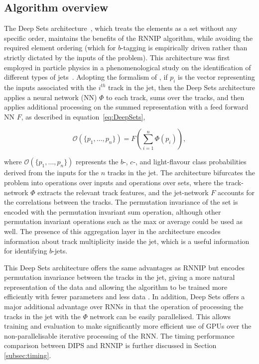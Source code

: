 \def\figpath{figures/ftag/dips-note/}

\subsection{Algorithm overview}

The Deep Sets architecture~\cite{DBLP:journals/corr/ZaheerKRPSS17}, which treats the elements as a set without any specific order, maintains the benefits of the RNNIP algorithm, while avoiding the required element ordering (which for $b$-tagging is empirically driven rather than strictly dictated by the inputs of the problem).
This architecture was first employed in particle physics in a phenomenological study on the identification of different types of jets~\cite{Komiske_2019}.  
Adopting the formalism of \cite{Komiske_2019}, if $p_i$ is the vector representing the inputs associated with the $i^{th}$ track in the jet, then the Deep Sets architecture applies a neural network (NN) $\Phi$ to each track, sums over the tracks, and then applies additional processing on the summed representation with a feed forward NN $F$, as described in equation~\ref{eq:DeepSets},

\begin{equation}
\mathcal{O}\left(  \{ p_1 , \ldots , p_n \}  \right) = F \left( \sum_{i = 1}^n \Phi \left( p_i \right) \right),
\label{eq:DeepSets}
\end{equation}

where $\mathcal{O} \left(  \{ p_1 , \ldots , p_n \}  \right)$ represents the $b$-, $c$-, and light-flavour class probabilities derived from the inputs for the $n$ tracks in the jet. 
The architecture bifurcates the problem into operations over inputs and operations over sets, where the track-network $\Phi$ extracts the relevant track features, and the jet-network $F$ accounts for the correlations between the tracks. 
The permutation invariance of the set is encoded with the permutation invariant sum operation, although other permutation invariant operations such as the max or average could be used as well. 
The presence of this aggregation layer in the architecture encodes information about track multiplicity inside the jet, which is a useful information for identifying $b$-jets.

This Deep Sets architecture offers the same advantages as RNNIP but encodes permutation invariance between the tracks in the jet, giving a more natural representation of the data and allowing the algorithm to be trained more efficiently with fewer parameters and less data \cite{DBLP:journals/corr/abs-1806-01261}.  
In addition, Deep Sets offers a major additional advantage over RNNs in that the operation of processing the tracks in the jet with the $\Phi$ network can be easily parallelised. 
This allows training and evaluation to make significantly more efficient use of GPUs over the non-parallelisable iterative processing of the RNN. 
The timing performance comparison between DIPS and RNNIP is further discussed in Section \ref{subsec:timing}.
 
